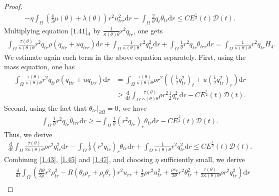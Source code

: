 \documentclass[10pt,a4paper]{amsart}
\newcommand{\dif}{\mathrm{d}}
\begin{document}
\begin{proof}
\begin{align}
- \eta \int_{\Omega} \left(\frac{4}{3}\mu(\theta)+\lambda(\theta)\right) r^2u_{trr}^2 \dif r -\int_{\Omega} \frac{2}{\theta} q_t \theta_{tr} \dif r \le C E^\frac{1}{2}(t) \mathcal D(t). \label{1.45}
 \end{align}
 Multiplying equation $\eqref{1.41}_4$ by $\frac{1}{\kappa(\theta)\theta} r^2 q_{tr}$, one gets
 \begin{align}
 \int_{\Omega} \frac{\tau(\theta) }{\kappa(\theta)\theta} r^2 q_{tr} \rho (q_{ttr} + u q_{trr} )\dif r +\int_{\Omega} \frac{1}{\kappa(\theta)\theta}r^2 q_{tr}^2 \dif r+\int_{\Omega} \frac{1}{\theta} r^2 q_{tr} \theta_{trr} \dif r=\int_{\Omega} \frac{1}{\kappa(\theta)\theta} r^2 q_{tr} H_4.
 \end{align}
 We estimate again each term in the above equation separately.
First, using the mass equation, one has
 \begin{align*}
  \int_{\Omega} \frac{\tau(\theta)}{\kappa(\theta)\theta}  r^2  q_{tr} \rho( q_{ttr}+u q_{trr}) \dif r&= \int_{\Omega} \frac{\tau(\theta)}{\kappa(\theta)\theta} \rho r^2 ( (\frac{1}{2} q_{tr}^2)_t+u (\frac{1}{2}q_{tr}^2)_r) \dif r\\
  &\ge \frac{\dif}{\dif t} \int_{\Omega} \frac{\tau(\theta)}{\kappa(\theta)\theta} \rho r^2  \frac{1}{2} q_{tr}^2 \dif r -CE^\frac{1}{2}(t) \mathcal D(t).
  \end{align*}
 Second, using the fact that $\theta_{tr}|_{\partial \Omega}=0$, we have
 \begin{align*}
 \int_{\Omega} \frac{1}{\theta} r^2 q_{tr}\theta_{trr}   \dif r \ge -\int_{\Omega} \frac{1}{\theta} (r^2 q_{tr})_r  \theta_{tr} \dif r -CE^\frac{1}{2}(t) \mathcal D(t).
 \end{align*}
 Thus, we derive
 \begin{align}\label{1.47}
 \frac{\dif}{\dif t} \int_{\Omega} \frac{\tau(\theta)}{2\kappa(\theta)\theta} \rho r^2 q_{tr}^2 \dif r -\int_{\Omega} \frac{1}{\theta} (r^2 q_{tr})_r \theta_{tr} \dif r+\int_{\Omega} \frac{1}{\kappa(\theta)\theta} r^2 q_{tr}^2 \dif r \le CE^\frac{1}{2}(t) \mathcal D(t).
 \end{align}
Combining \eqref{1.43}, \eqref{1.45} and \eqref{1.47}, and choosing $\eta$ sufficiently small, we derive
\begin{align}
  &\frac{\dif}{\dif t} \int_{\Omega} \left( \frac{R\theta}{2\rho} r^2 \rho_{tr}^2 -R(\theta_t \rho_r+\rho_t\theta_r)r^2u_{rr}+\frac{1}{2}\rho r^2 u_{tr}^2+\frac{\rho e_\theta}{2\theta} r^2 \theta_{tr}^2+\frac{\tau(\theta)}{2\kappa(\theta)\theta} \rho r^2 q_{tr}^2 \right)\dif r \nonumber \\

\end{align}
\end{proof}
\end{document}
